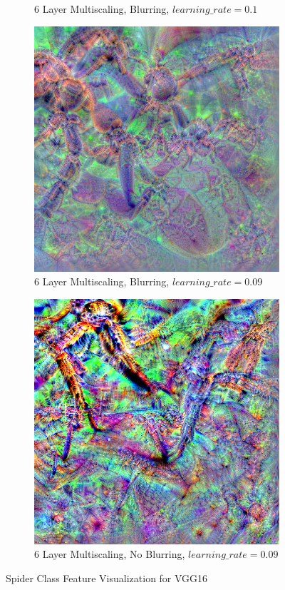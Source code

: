 \begin{figure}
\begin{subfigure}[t]{0.46\textwidth}
        \caption{6 Layer Multiscaling, Blurring, \(learning\_rate = 0.1\)}
    \end{subfigure}
    \hfill
    \begin{subfigure}[t]{0.46\textwidth}
        \captionsetup{justification=centering}
        \centering
        \includegraphics[width=.7\linewidth]{figuras/feat_vis/experiments/classes/cl77/random_image_ci77_lr9e-2_pl6.png}
        \caption{6 Layer Multiscaling, Blurring, \(learning\_rate = 0.09\)}
    \end{subfigure}
    \hfill
    \begin{subfigure}[t]{0.46\textwidth}
        \captionsetup{justification=centering}
        \centering
        \includegraphics[width=.7\linewidth]{figuras/feat_vis/experiments/classes/cl77/random_image_ci77_lr9e-2_pl6_no-blur.png}
        \caption{6 Layer Multiscaling, No Blurring, \(learning\_rate = 0.09\)}
    \end{subfigure}

    \caption{Spider Class Feature Visualization for VGG16}
    \label{fig:class_spider}
\end{figure}

